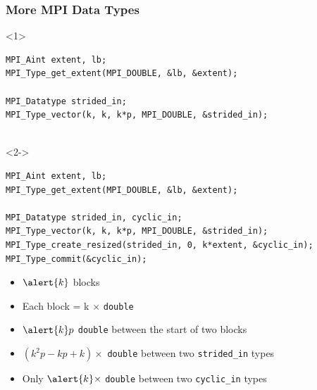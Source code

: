 \documentclass[xcolor={rgb,x11names,svgnames},rgb,x11names,svgnames]{beamer}
\newenvironment{wider}{%
\begin{adjustwidth}{-0.6cm}{}%
  \begin{minipage}{12cm}%
}{%
\end{minipage}%
\end{adjustwidth}%
}
\begin{document}
\begin{frame}[label=conversion,fragile]
\frametitle{More MPI Data Types}

\begin{overlayarea}{12cm}{3.5cm}
\begin{wider}
  \begin{onlyenv}<1>
\begin{verbatim}
MPI_Aint extent, lb;
MPI_Type_get_extent(MPI_DOUBLE, &lb, &extent);

MPI_Datatype strided_in;
MPI_Type_vector(k, k, k*p, MPI_DOUBLE, &strided_in);


\end{verbatim}
\end{onlyenv}

\begin{onlyenv}<2->
\begin{verbatim}
MPI_Aint extent, lb;
MPI_Type_get_extent(MPI_DOUBLE, &lb, &extent);

MPI_Datatype strided_in, cyclic_in;
MPI_Type_vector(k, k, k*p, MPI_DOUBLE, &strided_in);
MPI_Type_create_resized(strided_in, 0, k*extent, &cyclic_in);
MPI_Type_commit(&cyclic_in);
\end{verbatim}
\end{onlyenv}
\end{wider}
\end{overlayarea}

\begin{itemize}
\item $\alert{k}$ blocks
\item Each block = \alert{k} $\times$ \texttt{double}
\item $\alert{k}p$ \texttt{double} between the start of two blocks
\item<only@1> $(k^2p - kp + k) \times$ \texttt{double} between two \texttt{strided_in} types
\item<only@2-> Only $\alert{k} \times$ \texttt{double} between two \texttt{cyclic_in} types
\end{itemize}

\end{frame}
\end{document}
